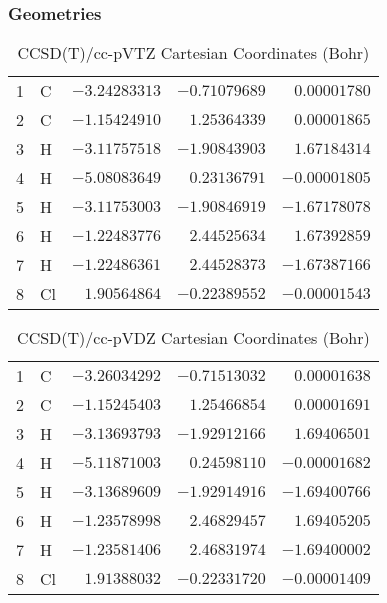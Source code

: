 \documentclass[10pt,oneside]{article}
\begin{document}
\subsubsection*{Geometries}
\begin{table}[h!]
\centering
\caption{CCSD(T)/cc-pVTZ Cartesian Coordinates (Bohr)}
\begin{tabular}{llrrr}
1  & C  & $-3.24283313$ & $-0.71079689$ & $ 0.00001780$ \\
2  & C  & $-1.15424910$ & $ 1.25364339$ & $ 0.00001865$ \\
3  & H  & $-3.11757518$ & $-1.90843903$ & $ 1.67184314$ \\
4  & H  & $-5.08083649$ & $ 0.23136791$ & $-0.00001805$ \\
5  & H  & $-3.11753003$ & $-1.90846919$ & $-1.67178078$ \\
6  & H  & $-1.22483776$ & $ 2.44525634$ & $ 1.67392859$ \\
7  & H  & $-1.22486361$ & $ 2.44528373$ & $-1.67387166$ \\
8  & Cl & $ 1.90564864$ & $-0.22389552$ & $-0.00001543$ \\
\end{tabular}
\end{table}

\begin{table}[h!]
\centering
\caption{CCSD(T)/cc-pVDZ Cartesian Coordinates (Bohr)}
\begin{tabular}{llrrr}
1  & C  & $-3.26034292$ & $-0.71513032$ & $ 0.00001638$ \\
2  & C  & $-1.15245403$ & $ 1.25466854$ & $ 0.00001691$ \\
3  & H  & $-3.13693793$ & $-1.92912166$ & $ 1.69406501$ \\
4  & H  & $-5.11871003$ & $ 0.24598110$ & $-0.00001682$ \\
5  & H  & $-3.13689609$ & $-1.92914916$ & $-1.69400766$ \\
6  & H  & $-1.23578998$ & $ 2.46829457$ & $ 1.69405205$ \\
7  & H  & $-1.23581406$ & $ 2.46831974$ & $-1.69400002$ \\
8  & Cl & $ 1.91388032$ & $-0.22331720$ & $-0.00001409$ \\
\end{tabular}
\end{table}
\end{document}
